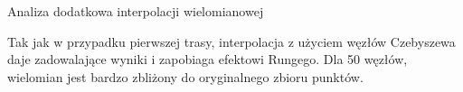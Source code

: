 \documentclass{article}
\begin{document}
\begin{section}{Analiza dodatkowa interpolacji wielomianowej}
\begin{figure}[H]
  \end{figure}
  \begin{figure}[H]
    \centering
  \end{figure}

  Tak jak w przypadku pierwszej trasy, interpolacja z użyciem węzłów Czebyszewa daje zadowalające wyniki i zapobiaga
  efektowi Rungego. Dla 50 węzłów, wielomian jest bardzo zbliżony do oryginalnego zbioru punktów.
\end{section}
\end{document}
